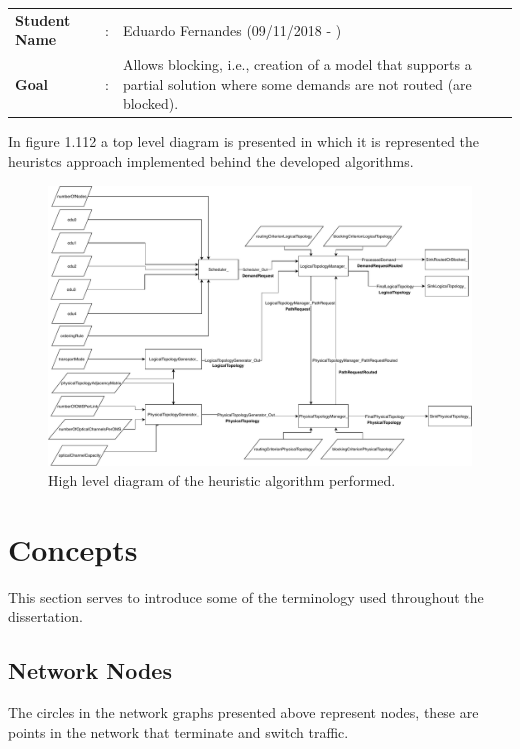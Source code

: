 \begin{tcolorbox}	
	\begin{tabular}{p{2.75cm} p{0.2cm} p{10.5cm}} 	
		\textbf{Student Name}   &:& Eduardo Fernandes    (09/11/2018 - )\\
		\textbf{Goal}           &:& Allows blocking, i.e., creation of a model that supports a partial solution where some demands are not routed (are blocked).
	\end{tabular}
\end{tcolorbox}

 \vspace{11pt}
 In figure 1.112 a top level diagram is presented in which it is represented the heuristcs approach implemented behind the developed algorithms. %

\begin{figure}[H]
	\centering
	\includegraphics[width=15cm]{sdf/heuristic/transparent/figures/novoFluxograma}
	\caption{High level diagram of the heuristic algorithm performed.}
	\label{fluxogram_transparent_surv}
\end{figure}

\section{Concepts}
This section serves to introduce some of the terminology used throughout the dissertation.
\subsection{Network Nodes} 
The circles in the network graphs presented above represent nodes, these are points in the network that terminate and switch traffic.
